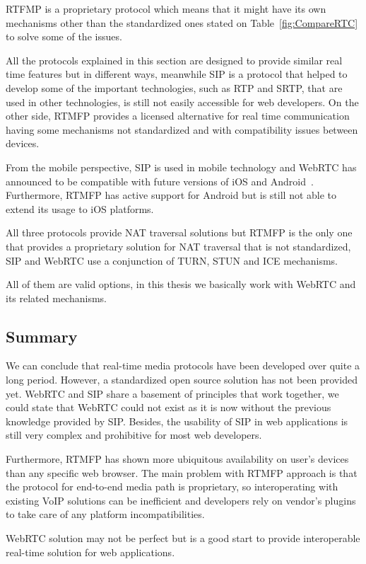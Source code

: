 RTFMP is a proprietary protocol which means that it might have its own mechanisms other than the standardized ones stated on Table~\ref{fig:CompareRTC} to solve some of the issues.

All the protocols explained in this section are designed to provide similar real time features but in different ways, meanwhile SIP is a protocol that helped to develop some of the important technologies, such as RTP and SRTP, that are used in other technologies, is still not easily accessible for web developers. On the other side, RTMFP provides a licensed alternative for real time communication having some mechanisms not standardized and with compatibility issues between devices.

From the mobile perspective, SIP is used in mobile technology and WebRTC has announced to be compatible with future versions of iOS and Android~\cite{ericssonbowser}. Furthermore, RTMFP has active support for Android but is still not able to extend its usage to iOS platforms.

All three protocols provide NAT traversal solutions but RTMFP is the only one that provides a proprietary solution for NAT traversal that is not standardized, SIP and WebRTC use a conjunction of TURN, STUN and ICE mechanisms.
	
All of them are valid options, in this thesis we basically work with WebRTC and its related mechanisms.	

\subsection{Summary}

We can conclude that real-time media protocols have been developed over quite a long period. However, a standardized open source solution has not been provided yet.  WebRTC and SIP share a basement of principles that work together, we could state that WebRTC could not exist as it is now without the previous knowledge provided by SIP. Besides, the usability of SIP in web applications is still very complex and prohibitive for most web developers.

Furthermore, RTMFP has shown more ubiquitous availability on user's devices than any specific web browser. The main problem with RTMFP approach is that the protocol for end-to-end media path is proprietary, so interoperating with existing VoIP solutions can be inefficient and developers rely on vendor's plugins to take care of any platform incompatibilities.

WebRTC solution may not be perfect but is a good start to provide interoperable real-time solution for web applications.